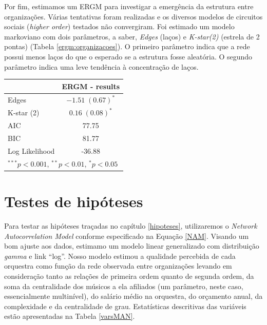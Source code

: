 \documentclass[a4paper, 12pt, openright, oneside, german, french, english, brazil]{abntex2}
\begin{document}
	Por fim, estimamos um ERGM para investigar a emergência da estrutura entre organizações. Várias tentativas foram realizadas e os diversos modelos de circuitos sociais (\textit{higher order}) testados não convergiram. Foi estimado um modelo markoviano com dois parâmetros, a saber, \textit{Edges} (laços) e \textit{K-star(2)} (estrela de 2 pontas) (Tabela \ref{ergm:organizacoes}). O primeiro parâmetro indica que a rede possui menos laços do que o esperado se a estrutura fosse aleatória. O segundo parâmetro indica uma leve tendência à concentração de laços.
	
	\begin{table}[!ht]
			{\begin{tabular}{l c }
				\hline
				& ERGM - results \\
				\hline
				Edges          & $-1.51 \; (0.67)^{*}$ \\
				K-star (2)         & $0.16 \; (0.08)^{*}$  \\
				\hline
				AIC            & 77.75                 \\
				BIC            & 81.77                 \\
				Log Likelihood & -36.88                \\
				\hline
				\multicolumn{2}{l}{\scriptsize{$^{***}p<0.001$, $^{**}p<0.01$, $^*p<0.05$}}
			\end{tabular}
	}
	{}
	\end{table}
	
	
	\section{Testes de hipóteses}
	
	Para testar as hipóteses traçadas no capítulo \ref{hipoteses}, utilizaremos o \textit{Network Autocorrelation Model} conforme especificado na Equação \ref{NAM}. Visando um bom ajuste aos dados, estimamo um modelo linear generalizado com distribuição \textit{gamma} e link ``log''. Nosso modelo estimou a qualidade percebida de cada orquestra como função da rede observada entre organizações levando em consideração tanto as relações de primeira ordem quanto de segunda ordem, da soma da centralidade dos músicos a ela afiliados (um parâmetro, neste caso, essencialmente multinível), do salário médio na orquestra, do orçamento anual, da complexidade
	e da centralidade de grau.	
	Estatísticas descritivas das variáveis estão apresentadas na Tabela \ref{varsMAN}.
	
\end{document}
